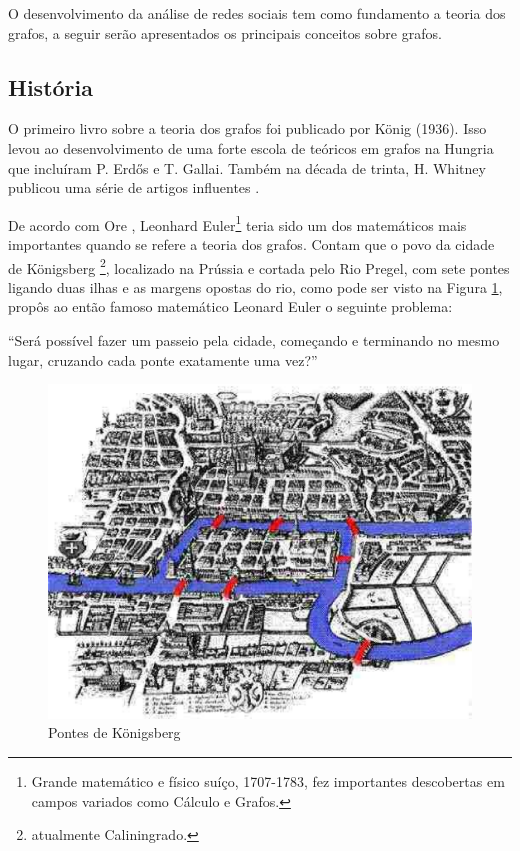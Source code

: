 O desenvolvimento da análise de redes sociais tem como fundamento a teoria dos grafos, a seguir serão apresentados os principais conceitos sobre grafos.

\subsection{História}

O primeiro livro sobre a teoria dos grafos foi publicado por König (1936). Isso levou ao desenvolvimento de uma forte escola de teóricos em grafos na Hungria que incluíram P. Erdős e T. Gallai. Também na década de trinta, H. Whitney publicou uma série de artigos influentes \cite{Bondy:2007}.

De acordo com Ore \cite{Ore:1963}, Leonhard Euler\footnote{Grande matemático e físico suíço, 1707-1783, fez importantes descobertas em campos variados como Cálculo e Grafos.} teria sido um dos matemáticos mais importantes quando se refere a teoria dos grafos. Contam que o povo da cidade de Königsberg \footnote{atualmente Caliningrado.}, localizado na Prússia e cortada pelo Rio Pregel, com sete pontes ligando duas ilhas e as margens opostas do rio, como pode ser visto na Figura \ref{Konigsberg}, propôs ao então famoso matemático Leonard Euler o seguinte problema:

	“Será possível fazer um passeio pela cidade, começando e
	terminando no mesmo lugar, cruzando cada ponte exatamente uma vez?”

\begin{figure}[!h]
	\centering
	\includegraphics[scale=0.5]{figuras/capitulo1/Konigsberg.eps}
	\caption{Pontes de Königsberg}
	\label{Konigsberg}
\end{figure}

